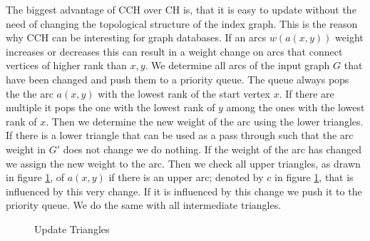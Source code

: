 The biggest advantage of CCH over CH is, that it is easy to update without the need of changing the topological structure of the index graph. This is the reason why CCH can be interesting for graph databases.
If an arcs $w(a(x, y))$ weight increases or decreases this can result in a weight change on arcs that connect vertices of higher rank than $x, y$. We determine all arcs of the input graph $G$ that have been changed 
and push them to a priority queue. The queue always pops the the arc $a(x,y)$ with the lowest rank of the start vertex $x$. If there are multiple it pops the one with the lowest rank of $y$ among the ones with the lowest rank of $x$. Then we determine 
the new weight of the arc using the lower triangles. If there is a lower triangle that can be used as a pass through such that the arc weight in $G'$ does not change we do nothing. If the weight of the arc has changed
we assign the new weight to the arc. Then we check all upper triangles, as drawn in figure \ref{fig:updateTriangles}, of $a(x,y)$ if there is an upper arc; denoted by $c$ in figure \ref{fig:updateTriangles}, that is influenced by this very change. If it is influenced by this
change we push it to the priority queue. We do the same with all intermediate triangles. 
\\


\begin{figure}
    \centering
    
    \caption{Update Triangles}
    \label{fig:updateTriangles}
\end{figure}